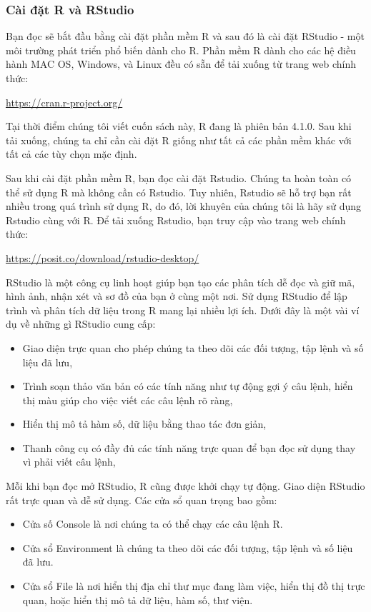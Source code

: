 \documentclass[
]{article}
\begin{document}
\hypertarget{cuxe0i-ux111ux1eb7t-r-vuxe0-rstudio}{%
\subsubsection{Cài đặt R và RStudio}\label{cuxe0i-ux111ux1eb7t-r-vuxe0-rstudio}}

Bạn đọc sẽ bắt đầu bằng cài đặt phần mềm R và sau đó là cài đặt RStudio - một môi trường phát triển phổ biến dành cho R. Phần mềm R dành cho các hệ điều hành MAC OS, Windows, và Linux đều có sẵn để tải xuống từ trang web chính thức:

\url{https://cran.r-project.org/}

Tại thời điểm chúng tôi viết cuốn sách này, R đang là phiên bản 4.1.0. Sau khi tải xuống, chúng ta chỉ cần cài đặt R giống như tất cả các phần mềm khác với tất cả các tùy chọn mặc định.

Sau khi cài đặt phần mềm R, bạn đọc cài đặt Rstudio. Chúng ta hoàn toàn có thể sử dụng R mà không cần có Rstudio. Tuy nhiên, Rstudio sẽ hỗ trợ bạn rất nhiều trong quá trình sử dụng R, do đó, lời khuyên của chúng tôi là hãy sử dụng Rstudio cùng với R. Để tải xuống Rstudio, bạn truy cập vào trang web chính thức:

\url{https://posit.co/download/rstudio-desktop/}

RStudio là một công cụ linh hoạt giúp bạn tạo các phân tích dễ đọc và giữ mã, hình ảnh, nhận xét và sơ đồ của bạn ở cùng một nơi. Sử dụng RStudio để lập trình và phân tích dữ liệu trong R mang lại nhiều lợi ích. Dưới đây là một vài ví dụ về những gì RStudio cung cấp:

\begin{itemize}
\item
  Giao diện trực quan cho phép chúng ta theo dõi các đối tượng, tập lệnh và số liệu đã lưu,
\item
  Trình soạn thảo văn bản có các tính năng như tự động gợi ý câu lệnh, hiển thị màu giúp cho việc viết các câu lệnh rõ ràng,
\item
  Hiển thị mô tả hàm số, dữ liệu bằng thao tác đơn giản,
\item
  Thanh công cụ có đầy đủ các tính năng trực quan để bạn đọc sử dụng thay vì phải viết câu lệnh,
\end{itemize}

Mỗi khi bạn đọc mở RStudio, R cũng được khởi chạy tự động. Giao diện RStudio rất trực quan và dễ sử dụng. Các cửa sổ quan trọng bao gồm:

\begin{itemize}
\item
  Cửa số Console là nơi chúng ta có thể chạy các câu lệnh R.
\item
  Cửa sổ Environment là chúng ta theo dõi các đối tượng, tập lệnh và số liệu đã lưu.
\item
  Cửa sổ File là nơi hiển thị địa chỉ thư mục đang làm việc, hiển thị đồ thị trực quan, hoặc hiển thị mô tả dữ liệu, hàm số, thư viện.
\end{itemize}
\end{document}
